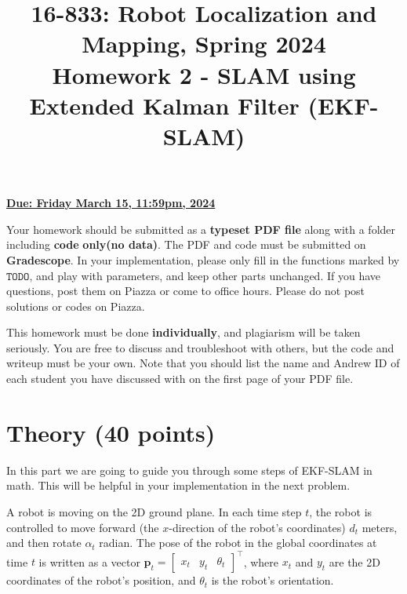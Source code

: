 \documentclass[12pt, a4paper]{article}
\date{}
\begin{document}
\title{\Large 16-833: Robot Localization and Mapping, Spring 2024\\
	\textbf{Homework 2 - SLAM using Extended Kalman Filter (EKF-SLAM)}}
\maketitle
\begin{flushright}
	\textbf{\uline{Due: Friday March 15, 11:59pm, 2024}}
	\par\end{flushright}


Your homework should be submitted as a\textbf{ typeset PDF file} along
with a\textbf{ }folder\textbf{ }including\textbf{ code} \textbf{only(no data)}.
The PDF and code must be submitted on \textbf{Gradescope}.
In your implementation, please only fill in the functions marked by $\mathtt{TODO}$,
and play with parameters, and keep other parts unchanged.
If you have questions, post them on Piazza or come to office hours.
Please do not post solutions or codes on Piazza.

This homework must be done \textbf{individually}, and plagiarism will
be taken seriously. You are free to discuss and troubleshoot with
others, but the code and writeup must be your own. Note that you should
list the name and Andrew ID of each student you have discussed with
on the first page of your PDF file.

\section{Theory (40 points)}

In this part we are going to guide you through some steps of EKF-SLAM
in math. This will be helpful in your implementation in the next problem.

A robot is moving on the 2D ground plane. In each time step $t$,
the robot is controlled to move forward (the $x$-direction of the
robot's coordinates) $d_{t}$ meters, and then rotate $\alpha_{t}$
radian. The pose of the robot in the global coordinates at time $t$
is written as a vector $\mathbf{p}_{t}=\left[\begin{array}{ccc}
			x_{t} & y_{t} & \theta_{t}\end{array}\right]^{\top}$, where $x_{t}$ and $y_{t}$ are the 2D coordinates of the robot's
position, and $\theta_{t}$ is the robot's orientation.
\end{document}
